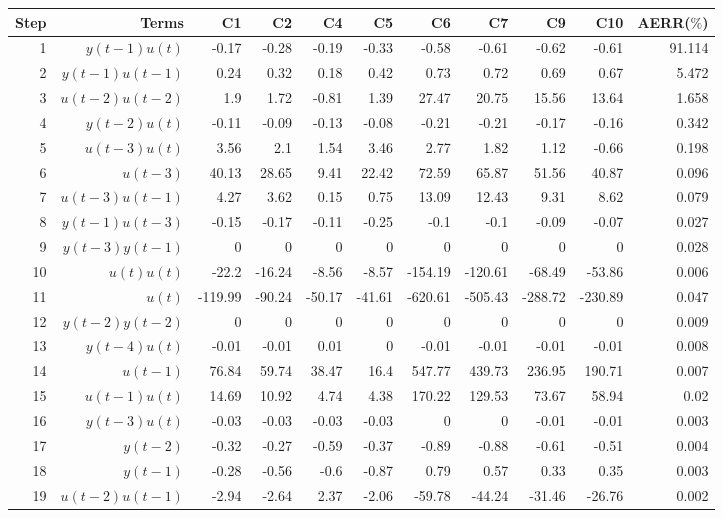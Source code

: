 \begin{tabular}{rrrrrrrrrrr}
Step & Terms & C1 & C2 & C4 & C5 & C6 & C7 & C9 & C10 & AERR($\%$) \\ 
\hline 
1 & $y(t-1)u(t)$ & -0.17 & -0.28 & -0.19 & -0.33 & -0.58 & -0.61 & -0.62 & -0.61 & 91.114 \\ 
2 & $y(t-1)u(t-1)$ & 0.24 & 0.32 & 0.18 & 0.42 & 0.73 & 0.72 & 0.69 & 0.67 & 5.472 \\ 
3 & $u(t-2)u(t-2)$ & 1.9 & 1.72 & -0.81 & 1.39 & 27.47 & 20.75 & 15.56 & 13.64 & 1.658 \\ 
4 & $y(t-2)u(t)$ & -0.11 & -0.09 & -0.13 & -0.08 & -0.21 & -0.21 & -0.17 & -0.16 & 0.342 \\ 
5 & $u(t-3)u(t)$ & 3.56 & 2.1 & 1.54 & 3.46 & 2.77 & 1.82 & 1.12 & -0.66 & 0.198 \\ 
6 & $u(t-3)$ & 40.13 & 28.65 & 9.41 & 22.42 & 72.59 & 65.87 & 51.56 & 40.87 & 0.096 \\ 
7 & $u(t-3)u(t-1)$ & 4.27 & 3.62 & 0.15 & 0.75 & 13.09 & 12.43 & 9.31 & 8.62 & 0.079 \\ 
8 & $y(t-1)u(t-3)$ & -0.15 & -0.17 & -0.11 & -0.25 & -0.1 & -0.1 & -0.09 & -0.07 & 0.027 \\ 
9 & $y(t-3)y(t-1)$ & 0 & 0 & 0 & 0 & 0 & 0 & 0 & 0 & 0.028 \\ 
10 & $u(t)u(t)$ & -22.2 & -16.24 & -8.56 & -8.57 & -154.19 & -120.61 & -68.49 & -53.86 & 0.006 \\ 
11 & $u(t)$ & -119.99 & -90.24 & -50.17 & -41.61 & -620.61 & -505.43 & -288.72 & -230.89 & 0.047 \\ 
12 & $y(t-2)y(t-2)$ & 0 & 0 & 0 & 0 & 0 & 0 & 0 & 0 & 0.009 \\ 
13 & $y(t-4)u(t)$ & -0.01 & -0.01 & 0.01 & 0 & -0.01 & -0.01 & -0.01 & -0.01 & 0.008 \\ 
14 & $u(t-1)$ & 76.84 & 59.74 & 38.47 & 16.4 & 547.77 & 439.73 & 236.95 & 190.71 & 0.007 \\ 
15 & $u(t-1)u(t)$ & 14.69 & 10.92 & 4.74 & 4.38 & 170.22 & 129.53 & 73.67 & 58.94 & 0.02 \\ 
16 & $y(t-3)u(t)$ & -0.03 & -0.03 & -0.03 & -0.03 & 0 & 0 & -0.01 & -0.01 & 0.003 \\ 
17 & $y(t-2)$ & -0.32 & -0.27 & -0.59 & -0.37 & -0.89 & -0.88 & -0.61 & -0.51 & 0.004 \\ 
18 & $y(t-1)$ & -0.28 & -0.56 & -0.6 & -0.87 & 0.79 & 0.57 & 0.33 & 0.35 & 0.003 \\ 
19 & $u(t-2)u(t-1)$ & -2.94 & -2.64 & 2.37 & -2.06 & -59.78 & -44.24 & -31.46 & -26.76 & 0.002 \\ 
\hline 
\end{tabular}